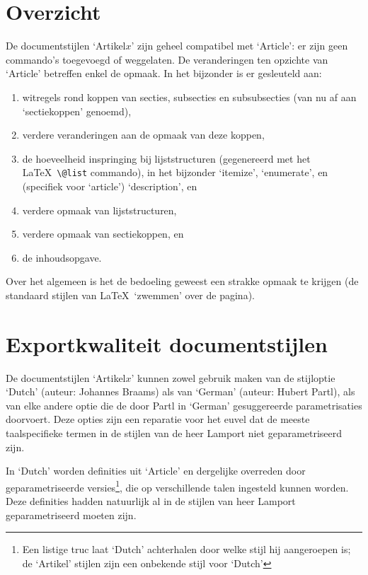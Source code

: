 \documentclass[a4paper]{artikel1} %
\begin{document}
\section{Overzicht}\label{overzicht:sectie}
 
De documentstijlen `Artikel$x$' zijn geheel compatibel met `Article':
er zijn geen commando's toegevoegd of weggelaten.  De veranderingen
ten opzichte van `Article' betreffen enkel de opmaak.  In het
bijzonder is er gesleuteld aan:
\begin{enumerate}
\item witregels rond koppen van secties, subsecties en subsubsecties
  (van nu af aan `sectiekoppen' genoemd),
\item verdere veranderingen aan de opmaak van deze koppen,
\item de hoeveelheid inspringing bij lijststructuren (gegenereerd met
  het \LaTeX\ \verb.\@list. commando), in het bijzonder `itemize',
  `enumerate', en (specifiek voor `article') `description', en
\item verdere opmaak van lijststructuren,
\item verdere opmaak van sectiekoppen, en
\item de inhoudsopgave.
\end{enumerate}
Over het algemeen is het de bedoeling geweest een strakke opmaak te
krijgen (de standaard stijlen van \LaTeX\ `zwemmen' over de pagina).
 
\section{Exportkwaliteit documentstijlen}
 
De documentstijlen `Artikel$x$' kunnen zowel gebruik maken van de
stijloptie `Dutch' (auteur: Johannes Braams) als van `German' (auteur:
Hubert Partl), als van elke andere optie die de door Partl in `German'
gesuggereerde parametrisaties doorvoert.  Deze opties zijn een
reparatie voor het euvel dat de meeste taalspecifieke termen in de
stijlen van de heer Lamport niet geparametriseerd zijn.
 
In `Dutch' worden definities uit `Article' en dergelijke overreden
door geparametriseerde versies\footnote{Een listige truc laat `Dutch'
  achterhalen door welke stijl hij aangeroepen is; de `Artikel'
  stijlen zijn een onbekende stijl voor `Dutch'}, die op verschillende
talen ingesteld kunnen worden.  Deze definities hadden natuurlijk al
in de stijlen van heer Lamport geparametriseerd moeten zijn.
 
\end{document}
